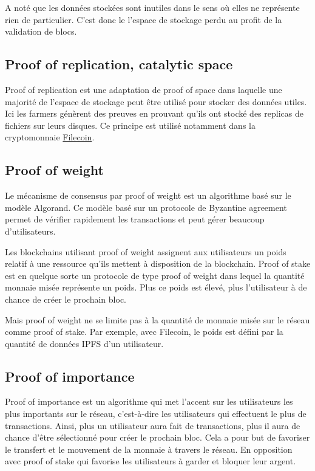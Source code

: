 A noté que les données stockées sont inutiles dans le sens où elles ne représente rien de particulier. C'est donc le l'espace de stockage perdu au profit de la validation de blocs.

\subsection{Proof of replication, catalytic space}

Proof of replication est une adaptation de proof of space dans laquelle une majorité de l'espace de stockage peut être utilisé pour stocker des données utiles. Ici les farmers génèrent des preuves en prouvant qu'ils ont stocké des replicas de fichiers sur leurs disques. Ce principe est utilisé notamment dans la cryptomonnaie \href{https://filecoin.io/}{Filecoin}.

\subsection{Proof of weight}

Le mécanisme de consensus par proof of weight est un algorithme basé sur le modèle Algorand. Ce modèle basé sur un protocole de Byzantine agreement permet de vérifier rapidement les transactions et peut gérer beaucoup d'utilisateurs. 

Les blockchains utilisant proof of weight assignent aux utilisateurs un poids relatif à une ressource qu'ils mettent à disposition de la blockchain. Proof of stake est en quelque sorte un protocole de type proof of weight dans lequel la quantité monnaie misée représente un poids. Plus ce poids est élevé, plus l'utilisateur à de chance de créer le prochain bloc.

Mais proof of weight ne se limite pas à la quantité de monnaie misée sur le réseau comme proof of stake. Par exemple, avec Filecoin, le poids est défini par la quantité de données IPFS d'un utilisateur.

\subsection{Proof of importance}

Proof of importance est un algorithme qui met l'accent sur les utilisateurs les plus importants sur le réseau, c'est-à-dire les utilisateurs qui effectuent le plus de transactions. Ainsi, plus un utilisateur aura fait de transactions, plus il aura de chance d'être sélectionné pour créer le prochain bloc. Cela a pour but de favoriser le transfert et le mouvement de la monnaie à travers le réseau. En opposition avec proof of stake qui favorise les utilisateurs à garder et bloquer leur argent.

